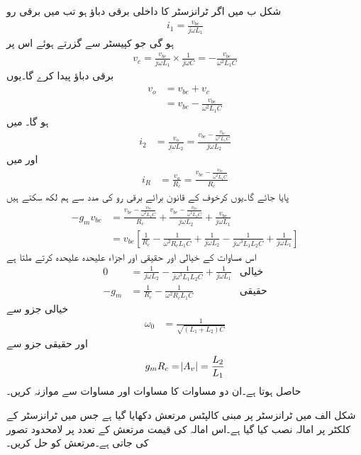 شکل  ب میں اگر ٹرانزسٹر کا داخلی برقی دباؤ  ہو تب  میں برقی رو
\begin{align*}
i_1=\frac{v_{be}}{j \omega L_1}
\end{align*}
ہو گی جو کپیسٹر  سے گزرتے ہوئے اس پر
\begin{align*}
v_c =\frac{v_{be}}{j \omega L_1} \times \frac{1}{j \omega C}=-\frac{v_{be}}{\omega^2 L_1 C}
\end{align*}
برقی دباؤ پیدا کرے گا۔یوں
\begin{align*}
v_o&=v_{be}+v_c\\
&=v_{be}-\frac{v_{be}}{\omega^2 L_1 C}
\end{align*}
ہو گا۔ میں
\begin{align*}
i_2&=\frac{v_o}{j \omega L_2}=\frac{v_{be}-\frac{v_{be}}{\omega^2 L_1 C}}{j \omega L_2}
\end{align*}
اور  میں
\begin{align*}
i_R&=\frac{v_o}{R_c}=\frac{v_{be}-\frac{v_{be}}{\omega^2 L_1 C}}{R_c}
\end{align*}
پایا جائے گا۔یوں کرخوف کے قانون برائے برقی رو کی مدد سے ہم لکھ سکتے ہیں
\begin{align*}
-g_m v_{be}&=\frac{v_{be}-\frac{v_{be}}{\omega^2 L_1 C}}{R_c}+\frac{v_{be}-\frac{v_{be}}{\omega^2 L_1 C}}{j \omega L_2}+\frac{v_{be}}{j \omega L_1}\\
&=v_{be} \left[\frac{1}{R_c}-\frac{1}{\omega^2 R_c L_1 C} +\frac{1}{j \omega L_2}-\frac{1}{j \omega^3 L_1 L_2 C} +\frac{1}{j \omega L_1}\right]
\end{align*}
اس مساوات کے خیالی اور حقیقی اور اجزاء علیحدہ علیحدہ کرتے ملتا ہے
\begin{align*}
0&=\frac{1}{j \omega L_2}-\frac{1}{j \omega^3 L_1 L_2 C}+\frac{1}{j \omega L_1} & \textrm{خیالی}\\
-g_m&=\frac{1}{R_c}-\frac{1}{\omega^2 R_c L_1 C} & \textrm{حقیقی}
\end{align*}
خیالی جزو سے
\begin{align}
\omega_0&=\frac{1}{\sqrt{\left(L_1+L_2 \right) C}}
\end{align}
اور حقیقی جزو سے
\begin{align}
g_m R_c=\abs{A_v}=\frac{L_2}{L_1}
\end{align}
حاصل ہوتا ہے۔ان دو مساوات کا مساوات   اور مساوات  سے موازنہ کریں۔

شکل  الف میں ٹرانزسٹر پر مبنی کالپٹس مرتعش دکھایا گیا ہے جس میں ٹرانزسٹر کے کلکٹر پر امالہ  نصب کیا گیا ہے۔اس امالہ کی قیمت مرتعش کے تعدد پر لامحدود تصور کی جاتی ہے۔مرتعش کو حل کریں۔

